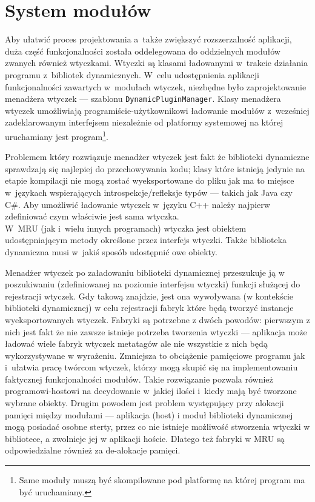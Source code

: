 \section{System modułów}
\label{system-modulow}
\par
Aby ułatwić proces projektowania a~także zwiększyć rozszerzalność aplikacji, duża część funkcjonalności została oddelegowana do oddzielnych modułów zwanych również wtyczkami.
Wtyczki są klasami ładowanymi w~trakcie działania programu z~bibliotek dynamicznych.
W~celu udostępnienia aplikacji funkcjonalności zawartych w~modułach wtyczek, niezbędne było zaprojektowanie menadżera wtyczek --- szablonu \texttt{DynamicPluginManager}.
Klasy menadżera wtyczek umożliwiają programiście-użytkownikowi ładowanie modułów z~wcześniej zadeklarowanym interfejsem niezależnie od platformy systemowej na której uruchamiany jest program\footnote{Same moduły muszą być skompilowane pod platformę na której program ma być uruchamiany.}.

\par
Problemem który rozwiązuje menadżer wtyczek jest fakt że biblioteki dynamiczne  sprawdzają się najlepiej do przechowywania kodu; klasy które istnieją jedynie na etapie kompilacji nie mogą zostać wyeksportowane do pliku jak ma to miejsce w~językach wspierających introspekcje/refleksje typów --- takich jak Java czy C\#.
Aby umożliwić ładowanie wtyczek w~języku C++ należy najpierw zdefiniować czym właściwie jest sama wtyczka.\\

W~MRU (jak i~wielu innych programach) wtyczka jest obiektem udostępniającym metody określone przez interfejs wtyczki. Także biblioteka dynamiczna musi w~jakiś sposób udostępnić owe obiekty.

\par
Menadżer wtyczek po załadowaniu biblioteki dynamicznej przeszukuje ją w poszukiwaniu (zdefiniowanej na poziomie interfejsu wtyczki) funkcji służącej do rejestracji wtyczek. Gdy takową znajdzie, jest ona wywoływana (w kontekście biblioteki dynamicznej) w celu rejestracji fabryk które będą tworzyć instancje wyeksportowanych wtyczek.
Fabryki są potrzebne z dwóch powodów: pierwszym z nich jest fakt że nie zawsze istnieje potrzeba tworzenia wtyczki --- aplikacja może ładować wiele fabryk wtyczek metatagów ale nie wszystkie z nich będą wykorzystywane w wyrażeniu.
Zmniejsza to obciążenie pamięciowe programu jak i~ułatwia pracę twórcom wtyczek, którzy mogą skupić się na implementowaniu faktycznej funkcjonalności modułów. Takie rozwiązanie pozwala również programowi-hostowi na decydowanie w~jakiej ilości i~kiedy mają być tworzone wybrane obiekty.
Drugim powodem jest problem występujący przy alokacji pamięci między modułami --- aplikacja (host) i moduł biblioteki dynamicznej mogą posiadać osobne sterty, przez co nie istnieje możliwość stworzenia wtyczki w bibliotece, a zwolnieje jej w aplikacji hoście. Dlatego też fabryki w MRU są odpowiedzialne również za de-alokacje pamięci.

